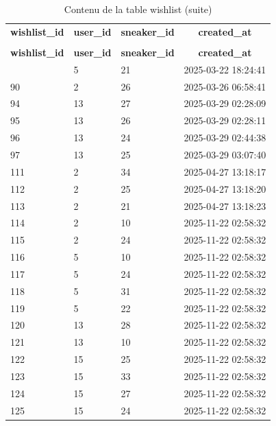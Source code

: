 %
%
 \begin{longtable}{|l|l|l|l|} 
 \hline \endhead \hline \endfoot \hline 
 \caption{Contenu de la table wishlist} \label{tab:wishlist-data} \\\hline \multicolumn{1}{|c|}{\textbf{wishlist\_id}} & \multicolumn{1}{|c|}{\textbf{user\_id}} & \multicolumn{1}{|c|}{\textbf{sneaker\_id}} & \multicolumn{1}{|c|}{\textbf{created\_at}} \\ \hline \hline  \endfirsthead 
\caption{Contenu de la table wishlist (suite)} \\ \hline \multicolumn{1}{|c|}{\textbf{wishlist\_id}} & \multicolumn{1}{|c|}{\textbf{user\_id}} & \multicolumn{1}{|c|}{\textbf{sneaker\_id}} & \multicolumn{1}{|c|}{\textbf{created\_at}} \\ \hline \hline \endhead \endfoot
20 & 5 & 21 & 2025-03-22 18:24:41 \\ \hline 
90 & 2 & 26 & 2025-03-26 06:58:41 \\ \hline 
94 & 13 & 27 & 2025-03-29 02:28:09 \\ \hline 
95 & 13 & 26 & 2025-03-29 02:28:11 \\ \hline 
96 & 13 & 24 & 2025-03-29 02:44:38 \\ \hline 
97 & 13 & 25 & 2025-03-29 03:07:40 \\ \hline 
111 & 2 & 34 & 2025-04-27 13:18:17 \\ \hline 
112 & 2 & 25 & 2025-04-27 13:18:20 \\ \hline 
113 & 2 & 21 & 2025-04-27 13:18:23 \\ \hline 
114 & 2 & 10 & 2025-11-22 02:58:32 \\ \hline 
115 & 2 & 24 & 2025-11-22 02:58:32 \\ \hline 
116 & 5 & 10 & 2025-11-22 02:58:32 \\ \hline 
117 & 5 & 24 & 2025-11-22 02:58:32 \\ \hline 
118 & 5 & 31 & 2025-11-22 02:58:32 \\ \hline 
119 & 5 & 22 & 2025-11-22 02:58:32 \\ \hline 
120 & 13 & 28 & 2025-11-22 02:58:32 \\ \hline 
121 & 13 & 10 & 2025-11-22 02:58:32 \\ \hline 
122 & 15 & 25 & 2025-11-22 02:58:32 \\ \hline 
123 & 15 & 33 & 2025-11-22 02:58:32 \\ \hline 
124 & 15 & 27 & 2025-11-22 02:58:32 \\ \hline 
125 & 15 & 24 & 2025-11-22 02:58:32 \\ \hline 

\end{longtable}
